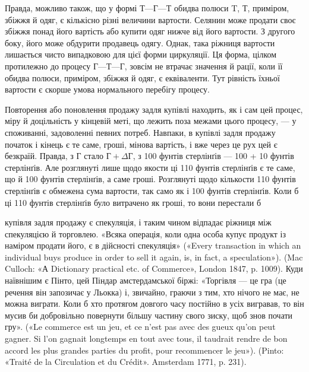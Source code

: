 Правда, можливо також, що у формі $Т — Г — Т$ обидва полюси
T, Т, приміром, збіжжя й одяг, є кількісно різні величини
вартости. Селянин може продати своє збіжжя понад його вартість
або купити одяг нижче від його вартости. З другого боку, його
може обдурити продавець одягу. Однак, така ріжниця вартости
лишається чисто випадковою для цієї форми циркуляції. Ця форма,
цілком протилежно до процесу $Г — Т — Г$, зовсім не втрачає
значення й рації, коли її обидва полюси, приміром, збіжжя й
одяг, є еквіваленти. Тут рівність їхньої вартости є скорше умова
нормального перебігу процесу.

Повторення або поновлення продажу задля купівлі находить,
як і сам цей процес, міру й доцільність у кінцевій меті, що лежить
поза межами цього процесу, — у споживанні, задоволенні певних
потреб. Навпаки, в купівлі задля продажу початок і кінець
є те саме, гроші, мінова вартість, і вже через це рух цей є безкраїй.
Правда, з Г стало $Г + ΔГ$, з 100 фунтів стерлінґів — 100 + 10 фунтів
стерлінґів. Але розглянуті лише щодо якости ці 110 фунтів
стерлінґів є те саме, що й 100 фунтів стерлінґів, а саме гроші.
Розглянуті щодо кількости 110 фунтів стерлінґів є обмежена сума
вартости, так само як і 100 фунтів стерлінґів. Коли б ці 110 фунтів
стерлінґів було витрачено як гроші, то вони перестали б

купівля задля продажу є спекуляція, і таким чином відпадає ріжниця
між спекуляцією й торговлею. «Всяка операція, коли одна особа купує
продукт із наміром продати його, є в дійсності спекуляція» («Every
transaction in which an individual buys produce in order to sell it again,
is, in fact, a speculation»). (Mac Culloch: «А Dictionary practical etc.
of Commerce», London 1847, p. 1009). Куди наївнішим є Пінто, цей Піндар
амстердамської біржі: «Торгівля — це гра (це речення він запозичає
у Льокка) і, звичайно, граючи з тим, хто нічого не має, не можна
виграти. Коли б хто протягом довгого часу постійно в усіх вигравав,
то він мусив би добровільно повернути більшу частину свого зиску,
щоб знов почати гру». («Le commerce est un jeu, et ce n’est pas avec des
gueux qu’on peut gagner. Si l’on gagnait longtemps en tout avec tous, il
taudrait rendre de bon accord les plus grandes parties du profit, pour
recommencer le jeu»). (Pinto: «Traité de la Circulation et du Crédit».
Amsterdam 1771, p. 231).
\parbreak{}  %
